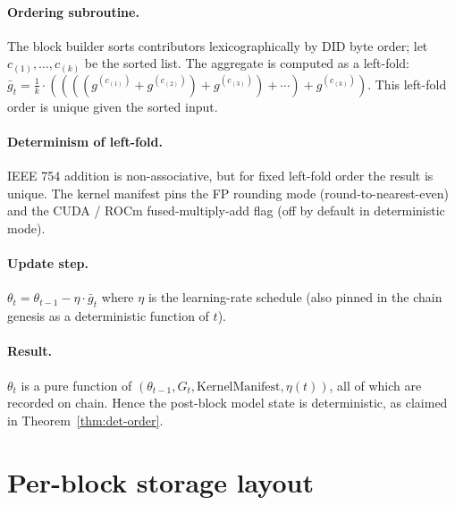 \documentclass[11pt]{article}
\begin{document}
\paragraph{Ordering subroutine.}
The block builder sorts contributors lexicographically by DID byte
order; let $c_{(1)}, \ldots, c_{(k)}$ be the sorted list. The
aggregate is computed as a left-fold:
$\bar{g}_t = \frac{1}{k} \cdot
  ((((g^{(c_{(1)})} + g^{(c_{(2)})}) + g^{(c_{(3)})}) +
    \cdots) + g^{(c_{(k)})}).$
This left-fold order is unique given the sorted input.

\paragraph{Determinism of left-fold.}
IEEE 754 addition is non-associative, but for fixed left-fold order
the result is unique. The kernel manifest pins the FP rounding
mode (round-to-nearest-even) and the CUDA / ROCm fused-multiply-add
flag (off by default in deterministic mode).

\paragraph{Update step.}
$\theta_t = \theta_{t-1} - \eta \cdot \bar{g}_t$ where $\eta$ is the
learning-rate schedule (also pinned in the chain genesis as a
deterministic function of $t$).

\paragraph{Result.}
$\theta_t$ is a pure function of $(\theta_{t-1}, G_t,
\mathrm{KernelManifest}, \eta(t))$, all of which are recorded on
chain. Hence the post-block model state is deterministic, as
claimed in Theorem~\ref{thm:det-order}.

\section{Per-block storage layout}
\label{sec:layout}
\end{document}
